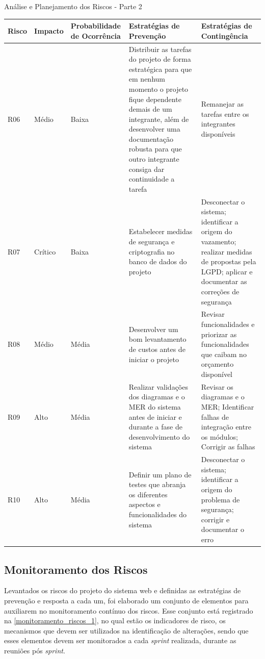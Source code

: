 \documentclass[
	12pt,				%
	openany,			%
	twoside,			%
	a4paper,			%
	english,			%
	french,				%
	spanish,			%
	brazil				%
	]{abntex2}
\begin{document}
 \begin{quadro}[H]
	\caption{Análise e Planejamento dos Riscos - Parte 2}
	\label{analise_riscos_2} 
	\begin{tabular} {|p{1cm}|p{1.6cm}|p{3cm}|p{4.7cm}|p{4.7cm}|}
		\hline
		\textbf{Risco} & \textbf{Impacto} & \textbf{Probabilidade de  Ocorrência} & \textbf{Estratégias de \newline Prevenção} & \textbf{Estratégias de \newline Contingência}\\
		\hline	
		R06 & Médio & Baixa & Distribuir as tarefas do projeto de forma estratégica  para que em nenhum momento o projeto fique dependente demais de um integrante, além de desenvolver uma documentação robusta para que outro integrante consiga dar continuidade a tarefa & Remanejar as tarefas entre os integrantes disponíveis \\
		\hline
			
	 	R07 & Crítico & Baixa & Estabelecer medidas de segurança e criptografia no banco de dados do projeto & Desconectar o sistema; identificar a origem do vazamento; realizar medidas de propostas pela LGPD; aplicar e documentar as correções de segurança \\
	 	\hline
	 	R08 & Médio & Média & Desenvolver um bom levantamento de custos antes de iniciar o projeto & Revisar funcionalidades e priorizar as funcionalidades que caibam no orçamento disponível \\
	 	\hline
	 	R09 & Alto & Média & Realizar validações dos diagramas e o MER do sistema antes de iniciar e durante a fase de desenvolvimento do sistema & Revisar os diagramas e o MER; Identificar falhas de integração entre os módulos; Corrigir as falhas \\
	 	\hline
	 	R10 & Alto & Média & Definir um plano de testes que abranja os diferentes aspectos e funcionalidades do sistema & Desconectar o sistema; identificar a origem do problema de segurança; corrigir e documentar o erro \\ \hline
 	\end{tabular}
\end{quadro}
\subsection{Monitoramento dos Riscos}
Levantados os riscos do projeto do sistema web e definidas as estratégias de prevenção e resposta a cada um, foi elaborado um conjunto de elementos para auxiliarem no monitoramento contínuo dos riscos. Esse conjunto está registrado na \autoref{monitoramento_riscos_1}, no qual estão os indicadores de risco, os mecanismos que devem ser utilizados na identificação de alterações, sendo que  esses elementos devem ser monitorados a cada \textit{sprint} realizada, durante as reuniões pós \textit{sprint}.
\end{document}
